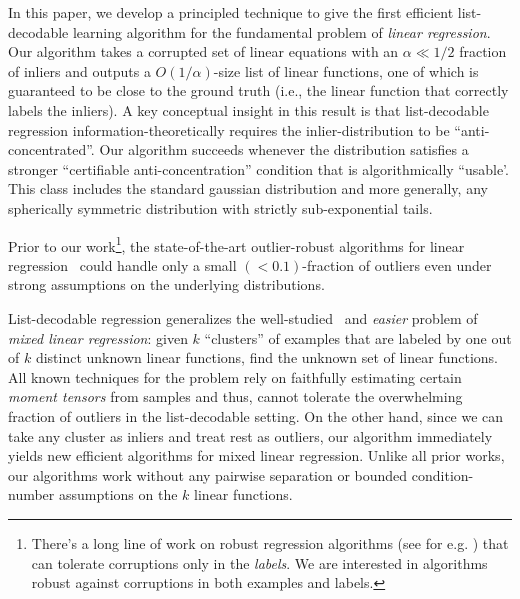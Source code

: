 In this paper, we develop a principled technique to give the first efficient list-decodable learning algorithm for the fundamental problem of \emph{linear regression}. Our algorithm takes a corrupted set of linear equations with an $\alpha \ll 1/2$ fraction of inliers and outputs a $O(1/\alpha)$-size list of linear functions, one of which is guaranteed to be close to the ground truth (i.e., the linear function that correctly labels the inliers). A key conceptual insight in this result is that list-decodable regression information-theoretically requires the inlier-distribution to be ``anti-concentrated''. Our algorithm succeeds whenever the distribution satisfies a stronger ``certifiable anti-concentration'' condition that is algorithmically ``usable'. This class includes the standard gaussian distribution and more generally, any spherically symmetric distribution with strictly sub-exponential tails.

Prior to our work\footnote{There's a long line of work on robust regression algorithms (see for e.g. \cite{DBLP:conf/nips/Bhatia0KK17,conf/soda/KarmalkarP19}) that can tolerate corruptions only in the \emph{labels}. We are interested in algorithms robust against corruptions in both examples and labels.}, the state-of-the-art outlier-robust algorithms for linear regression~\cite{DBLP:conf/colt/KlivansKM18,conf/soda/DiakonikolasKS19,journals/corr/abs-1803-02815,journals/corr/abs-1802-06485} could handle only a small $(<0.1)$-fraction of outliers even under strong assumptions on the underlying distributions. 

List-decodable regression generalizes the well-studied~\cite{MR1028403,doi:10.1162/neco.1994.6.2.181,MR2757044,2013arXiv1310.3745Y,DBLP:journals/corr/BalakrishnanWY14,DBLP:conf/colt/ChenYC14,DBLP:conf/nips/Zhong0D16,DBLP:conf/aistats/SedghiJA16,DBLP:conf/colt/LiL18} and {\em easier} problem of \emph{mixed linear regression}: given $k$ ``clusters'' of examples that are labeled by one out of $k$ distinct unknown linear functions, find the unknown set of linear functions. All known techniques for the problem rely on faithfully estimating certain \emph{moment tensors} from samples and thus, cannot tolerate the overwhelming fraction of outliers in the list-decodable setting. On the other hand, since we can take any cluster as inliers and treat rest as outliers, our algorithm immediately yields new efficient algorithms for mixed linear regression. Unlike all prior works, our algorithms work without any pairwise separation or bounded condition-number assumptions on the $k$ linear functions. 








